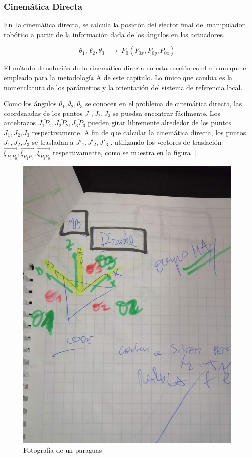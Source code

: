         \newpage


\subsubsection{Cinemática Directa}\label{mb_cd}
        
        En\ la cinemática directa, se calcula la posición del efector final del manipulador robótico a partir de la información dada de los ángulos en los actuadores.


        \begin{equation}
            \theta _{1},~ \theta _{2}, \theta _{3}~~~ \rightarrow ~  {P_{0}} \left( P_{0x},P_{0y},P_{0z} \right)
        \label{eq:cap4_MB_1}
        \end{equation}

        El método de solución de la cinemática directa en esta sección es el mismo que el empleado para la metodología A de este capitulo. Lo único que cambia es la nomenclatura de los parámetros y la orientación del sistema de referencia local.
        
        Como los ángulos   $\theta_1,\theta_2,\theta_3$  se conocen en el problema de cinemática directa, las coordenadas de los puntos $J_1,J_2,J_3$   se pueden encontrar fácilmente. Los antebrazos   $\overline{J_1P_1},\overline{J_2P_2},\overline{J_3P_3}$   pueden girar libremente alrededor de los puntos $J_1,J_2,J_3$   respectivamente. A fin de que calcular la cinemática directa, los puntos  $J_1,J_2,J_3$   se trasladan a  $J'_1,J'_2,J'_3$ , utilizando los vectores de traslación $\overrightarrow{\xi_{P_1 P_0}},\overrightarrow{\xi_{P_2P_0}},\overrightarrow{\xi_{P_3 P_0}}$    respectivamente, como se muestra en la figura \ref{}.
        
            \begin{figure}[htb]
                 \centering
               \includegraphics[width=0.5\linewidth]{Main/Chapter4/Images4/mb_direct.jpg}
                 
                  \caption{Fotografía de un paraguas}
                  \label{f:Cap4_Metodo_B_Modelacion_Cinematica_Posicion_3}
            \end{figure}        

